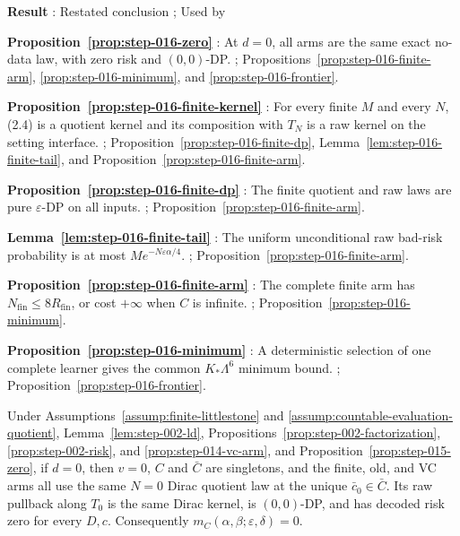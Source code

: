 \noindent\textbf{ Result }:  Restated conclusion ;  Used by \par
\noindent\textbf{ Proposition~\ref{prop:step-016-zero} }:  At \(d=0\), all arms are the same exact no-data law, with zero risk and \((0,0)\)-DP. ;  Propositions~\ref{prop:step-016-finite-arm}, \ref{prop:step-016-minimum}, and \ref{prop:step-016-frontier}. \par
\noindent\textbf{ Proposition~\ref{prop:step-016-finite-kernel} }:  For every finite \(M\) and every \(N\), (2.4) is a quotient kernel and its composition with \(T_N\) is a raw kernel on the setting interface. ;  Proposition~\ref{prop:step-016-finite-dp}, Lemma~\ref{lem:step-016-finite-tail}, and Proposition~\ref{prop:step-016-finite-arm}. \par
\noindent\textbf{ Proposition~\ref{prop:step-016-finite-dp} }:  The finite quotient and raw laws are pure \(\varepsilon\)-DP on all inputs. ;  Proposition~\ref{prop:step-016-finite-arm}. \par
\noindent\textbf{ Lemma~\ref{lem:step-016-finite-tail} }:  The uniform unconditional raw bad-risk probability is at most \(M e^{-N\varepsilon\alpha/4}\). ;  Proposition~\ref{prop:step-016-finite-arm}. \par
\noindent\textbf{ Proposition~\ref{prop:step-016-finite-arm} }:  The complete finite arm has \(N_{\mathrm{fin}}\le8R_{\mathrm{fin}}\), or cost \(+\infty\) when \(C\) is infinite. ;  Proposition~\ref{prop:step-016-minimum}. \par
\noindent\textbf{ Proposition~\ref{prop:step-016-minimum} }:  A deterministic selection of one complete learner gives the common \(K_*\Lambda^6\) minimum bound. ;  Proposition~\ref{prop:step-016-frontier}. \par



\begin{proposition}\label{prop:step-016-zero}
Under Assumptions~\ref{assump:finite-littlestone} and
\ref{assump:countable-evaluation-quotient}, Lemma~\ref{lem:step-002-ld}, 
Propositions~\ref{prop:step-002-factorization},
\ref{prop:step-002-risk}, and
\ref{prop:step-014-vc-arm}, and Proposition~\ref{prop:step-015-zero}, if \(d=0\), then \(v=0\),
\(C\) and \(\bar C\) are singletons, and the finite, old, and VC arms all
use the same \(N=0\) Dirac quotient law at the unique
\(\bar c_0\in\bar C\). Its raw pullback along \(T_0\) is the same Dirac
kernel, is \((0,0)\)-DP, and has decoded risk zero for every \(D,c\).
Consequently \(m_C(\alpha,\beta;\varepsilon,\delta)=0\).


\end{proposition}

